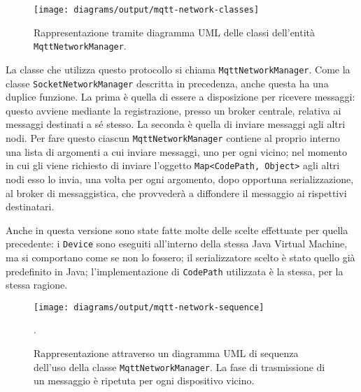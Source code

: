 \begin{figure}
  \centering
  \texttt{[image: diagrams/output/mqtt-network-classes]}
  \caption{Rappresentazione tramite diagramma UML delle classi dell'entità
    \texttt{MqttNetworkManager}.}
  \label{fig:emulated-network-classes}
\end{figure}

La classe che utilizza questo protocollo si chiama
\texttt{MqttNetworkManager}. Come la classe \texttt{SocketNetworkManager}
descritta in precedenza, anche questa ha una duplice funzione. La prima è quella
di essere a disposizione per ricevere messaggi: questo avviene mediante la
registrazione, presso un broker centrale, relativa ai messaggi destinati a sé
stesso. La seconda è quella di inviare messaggi agli altri nodi. Per fare questo
ciascun \texttt{MqttNetworkManager} contiene al proprio interno una lista di
argomenti a cui inviare messaggi, uno per ogni vicino; nel momento in cui gli
viene richiesto di inviare l'oggetto \texttt{Map<CodePath, Object>} agli altri
nodi esso lo invia, una volta per ogni argomento, dopo opportuna
serializzazione, al broker di messaggistica, che provvederà a diffondere il
messaggio ai rispettivi destinatari.

Anche in questa versione sono state fatte molte delle scelte effettuate per
quella precedente: i \texttt{Device} sono eseguiti all'interno della stessa Java
Virtual Machine, ma si comportano come se non lo fossero; il serializzatore
scelto è stato quello già predefinito in Java; l'implementazione di
\texttt{CodePath} utilizzata è la stessa, per la stessa ragione.

\begin{figure}
  \centering
  \texttt{[image: diagrams/output/mqtt-network-sequence]}
  \caption{Rappresentazione attraverso un diagramma UML di sequenza dell'uso
    della classe \texttt{MqttNetworkManager}. La fase di trasmissione di un
    messaggio è ripetuta per ogni dispositivo vicino.}
    .\label{fig:emulated-network-sequence}
\end{figure}